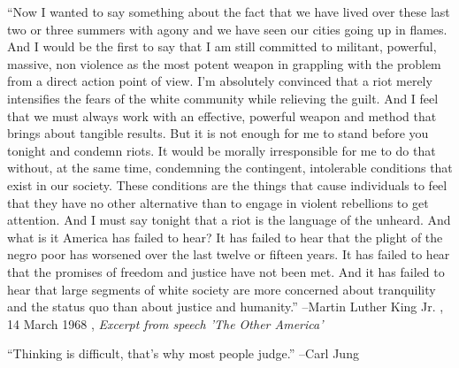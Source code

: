 \documentclass{article}%
\begin{document}
\linebreak%
\vspace{1mm}%
\begin{minipage}{\textwidth}%
\flushleft%
“Now I wanted to say something about the fact that we have lived over these last two or three summers with agony and we have seen our cities going up in flames. And I would be the first to say that I am still committed to militant, powerful, massive, non violence as the most potent weapon in grappling with the problem from a direct action point of view. I'm absolutely convinced that a riot merely intensifies the fears of the white community while relieving the guilt. And I feel that we must always work with an effective, powerful weapon and method that brings about tangible results. But it is not enough for me to stand before you tonight and condemn riots. It would be morally irresponsible for me to do that without, at the same time, condemning the contingent, intolerable conditions that exist in our society. These conditions are the things that cause individuals to feel that they have no other alternative than to engage in violent rebellions to get attention. And I must say tonight that a riot is the language of the unheard. And what is it America has failed to hear? It has failed to hear that the plight of the negro poor has worsened over the last twelve or fifteen years. It has failed to hear that the promises of freedom and justice have not been met. And it has failed to hear that large segments of white society are more concerned about tranquility and the status quo than about justice and humanity.”%
\linebreak%
\vspace{1mm}%
–Martin Luther King Jr.%
, 14 March 1968%
, \textit{Excerpt from speech 'The Other America'}%
\linebreak%
\vspace{1mm}%
\end{minipage}%
\linebreak%
\vspace{1mm}%
\begin{minipage}{\textwidth}%
\flushleft%
“Thinking is difficult, that's why most people judge.”%
\linebreak%
\vspace{1mm}%
–Carl Jung%
\linebreak%
\vspace{1mm}%
\end{minipage}%
\linebreak%
\vspace{1mm}%
\end{document}
